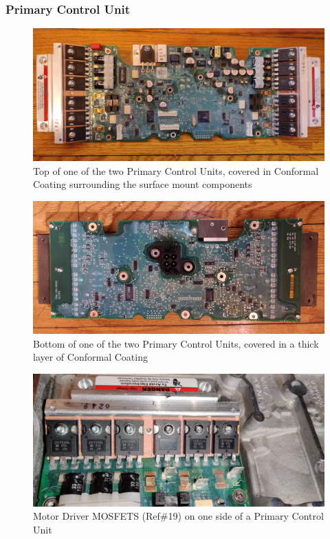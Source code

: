 \documentclass[]{formalLabReport}
\begin{document}
\subsubsection{Primary Control Unit}

\begin{figure}
    \includegraphics[]{entireBoardTop.jpg}
    \caption{Top of one of the two Primary Control Units, covered in Conformal Coating surrounding the surface mount components}
    \label{fig:entireBoardTop.jpg}
\end{figure}

\begin{figure}
    \includegraphics[]{entireBoardBottom.jpg}
    \caption{Bottom of one of the two Primary Control Units, covered in a thick layer of Conformal Coating}
    \label{fig:entireBoardBottom.jpg}
\end{figure}

\begin{figure}
    \includegraphics[]{segwayMotorDrivers.jpg}
    \caption{Motor Driver MOSFETS (Ref\#19) on one side of a Primary Control Unit}
    \label{fig:segwayMotorDrivers.jpg}
\end{figure}
\end{document}
